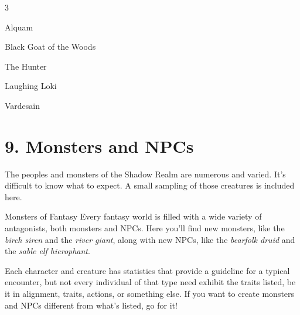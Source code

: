 \documentclass[10pt,a4paper,twoside,bg=print,twocolumn,openany,nodeprecatedcode]{dndbook}
\begin{document}
\begin{itemize}
\begin{multicols}{3}
\item Alquam
\item Black Goat of the Woods
\item The Hunter
\item Laughing Loki
\item Vardesain
\end{multicols}

\end{itemize}

\chapter{9. Monsters and NPCs}
The peoples and monsters of the Shadow Realm are numerous and varied. It's difficult to know what to expect. A small sampling of those creatures is included here.

\begin{DndSidebar}[float=!b]{Monsters of Fantasy}
Every fantasy world is filled with a wide variety of antagonists, both monsters and NPCs. Here you'll find new monsters, like the \textit{birch siren} and the \textit{river giant}, along with new NPCs, like the \textit{bearfolk druid} and the \textit{sable elf hierophant}.



Each character and creature has statistics that provide a guideline for a typical encounter, but not every individual of that type need exhibit the traits listed, be it in alignment, traits, actions, or something else. If you want to create monsters and NPCs different from what's listed, go for it!



\end{DndSidebar}
\end{document}
